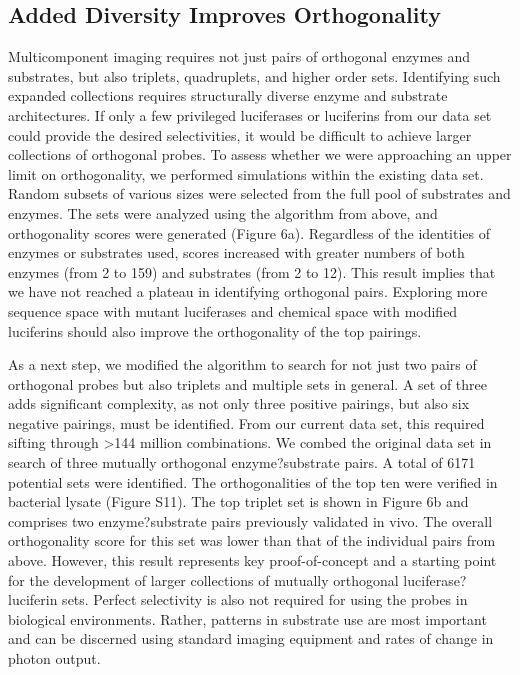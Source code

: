 \subsection*{Added Diversity Improves Orthogonality}
Multicomponent imaging requires not just pairs of orthogonal enzymes and substrates, but also triplets, quadruplets, and higher order sets. Identifying such expanded collections requires structurally diverse enzyme and substrate architectures. If only a few privileged luciferases or luciferins from our data set could provide the desired selectivities, it would be difficult to achieve larger collections of orthogonal probes. To assess whether we were approaching an upper limit on orthogonality, we performed simulations within the existing data set. Random subsets of various sizes were selected from the full pool of substrates and enzymes. The sets were analyzed using the algorithm from above, and orthogonality scores were generated (Figure 6a). Regardless of the identities of enzymes or substrates used, scores increased with greater numbers of both enzymes (from 2 to 159) and substrates (from 2 to 12). This result implies that we have not reached a plateau in identifying orthogonal pairs. Exploring more sequence space with mutant luciferases and chemical space with modified luciferins should also improve the orthogonality of the top pairings.
\par
As a next step, we modified the algorithm to search for not just two pairs of orthogonal probes but also triplets and multiple sets in general. A set of three adds significant complexity, as not only three positive pairings, but also six negative pairings, must be identified. From our current data set, this required sifting through >144 million combinations. We combed the original data set in search of three mutually orthogonal enzyme?substrate pairs. A total of 6171 potential sets were identified. The orthogonalities of the top ten were verified in bacterial lysate (Figure S11). The top triplet set is shown in Figure 6b and comprises two enzyme?substrate pairs previously validated in vivo. The overall orthogonality score for this set was lower than that of the individual pairs from above. However, this result represents key proof-of-concept and a starting point for the development of larger collections of mutually orthogonal luciferase?luciferin sets. Perfect selectivity is also not required for using the probes in biological environments. Rather, patterns in substrate use are most important and can be discerned using standard imaging equipment and rates of change in photon output.


